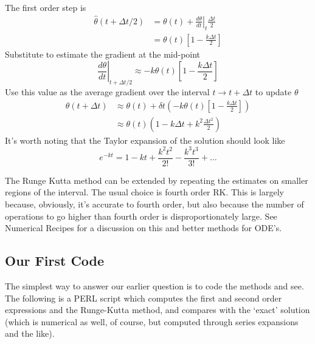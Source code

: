 \documentclass[10pt]{article}
\begin{document}
	The first order step is
		\begin{equation}
			\begin{split}
				\hat{\theta}(t+\Delta t /2) & = \theta(t) + \left.  \frac{d \theta}{d t} \right|_t \frac{\Delta t}{2} \\
					&= \theta(t) \left[ 1-\frac{k\Delta t}{2} \right]
			\end{split}
		\end{equation}
	Substitute to estimate the gradient at the mid-point
		\begin{equation}
			 \left. \frac{d \theta}{d t} \right|_{t+\Delta t /2} \approx -k \theta(t)  \left[ 1-\frac{k\Delta t}{2} \right]
		\end{equation}
	Use this value as the average gradient over the interval $t\rightarrow t+\Delta t$ to
	update $\theta$
		\begin{equation}
			\begin{split}
				\theta(t+\Delta t) & \approx \theta(t) + \delta t \left(  -k \theta(t)  \left[ 1-\frac{k\Delta t}{2} \right]  \right) \\
					& \approx \theta(t) \left( 1 - k \Delta t + k^2 \frac{\Delta t^2}{2} \right)
			\end{split}
		\end{equation}
	It's worth noting that the Taylor expansion of the solution should look like
		\begin{equation}
			e^{-kt} = 1 - kt + \frac{k^2 t^2}{2!} - \frac{k^3 t^3}{3!} + \ldots
		\end{equation}
	
	The Runge Kutta method can be extended by repeating the estimates on smaller regions of the interval.
	The usual choice is fourth order RK. This is largely because, obviously, it's accurate to fourth order, but also because
	the number of operations to go higher than fourth order is disproportionately large. See
	Numerical Recipes for a discussion on this and better methods for ODE's.
	
		
	\subsection{Our First Code}
	
	The simplest way to answer our earlier question is to code the
	methods and see. The following is a PERL script which computes the first and second 
	order expressions and the Runge-Kutta method, and compares with the `exact' solution
	(which is numerical as well, of course, but computed through series expansions and
	the like).
	
\end{document}
